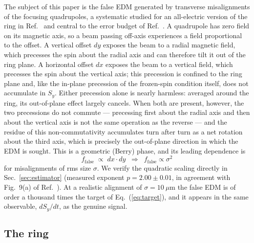\documentclass[aps,prab,reprint,superscriptaddress,nofootinbib]{revtex4-2}
\begin{document}
The subject of this paper is the false EDM generated by transverse
misalignments of the focusing quadrupoles, a systematic studied for an
all-electric version of the ring in Ref.~\cite{haciomeroglu2017} and central
to the error budget of Ref.~\cite{omarov}.  A quadrupole has zero field on its
magnetic axis, so a beam passing off-axis experiences a field proportional to
the offset.  A vertical offset $dy$ exposes the beam to a radial magnetic
field, which precesses the spin about the radial axis and can therefore tilt
it out of the ring plane.  A horizontal offset $dx$ exposes the beam to a
vertical field, which precesses the spin about the vertical axis; this
precession is confined to the ring plane and, like the in-plane precession of
the frozen-spin condition itself, does not accumulate in $S_y$.  Either
precession alone is nearly harmless: averaged around the ring, its
out-of-plane effect largely cancels.  When both are present, however, the two
precessions do not commute --- precessing first about the radial axis and then
about the vertical axis is not the same operation as the reverse --- and the
residue of this non-commutativity accumulates turn after turn as a net
rotation about the third axis, which is precisely the out-of-plane direction
in which the EDM is sought.  This is a geometric (Berry) phase, and its
leading dependence is
\begin{equation}
  f_{\text{false}} \;\propto\; dx \cdot dy
  \;\;\Longrightarrow\;\;
  f_{\text{false}} \propto \sigma^2
  \label{eq:sigma2}
\end{equation}
for misalignments of rms size $\sigma$.  We verify the quadratic scaling
directly in Sec.~\ref{sec:estimator} (measured exponent $p = 2.00 \pm 0.01$,
in agreement with Fig.~9(a) of Ref.~\cite{omarov}).  At a realistic alignment
of $\sigma = 10~\mu$m the false EDM is of order a thousand times the target of
Eq.~(\ref{eq:target}), and it appears in the same observable, $dS_y/dt$, as
the genuine signal.

\subsection{The ring}
\label{sec:ring}
\end{document}
